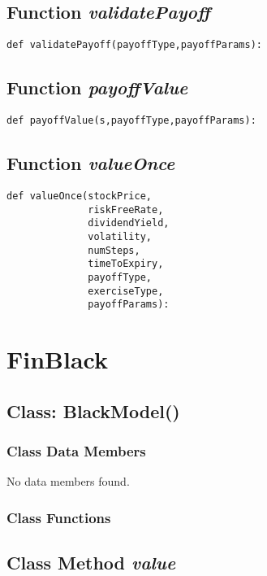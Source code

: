 \documentclass[twoside,11pt]{book}
\begin{document}
\subsection{Function {\it validatePayoff}}


\begin{lstlisting}
def validatePayoff(payoffType,payoffParams):
\end{lstlisting}

\subsection{Function {\it payoffValue}}


\begin{lstlisting}
def payoffValue(s,payoffType,payoffParams):
\end{lstlisting}

\subsection{Function {\it valueOnce}}


\begin{lstlisting}
def valueOnce(stockPrice,
              riskFreeRate,
              dividendYield,
              volatility,
              numSteps,
              timeToExpiry,
              payoffType,
              exerciseType,
              payoffParams):
\end{lstlisting}

\newpage
\section{FinBlack}

\subsection{Class: BlackModel()}


\subsubsection{Class Data Members}
No data members found.

\subsubsection{Class Functions}

\subsection{Class Method {\it value}}
\end{document}
